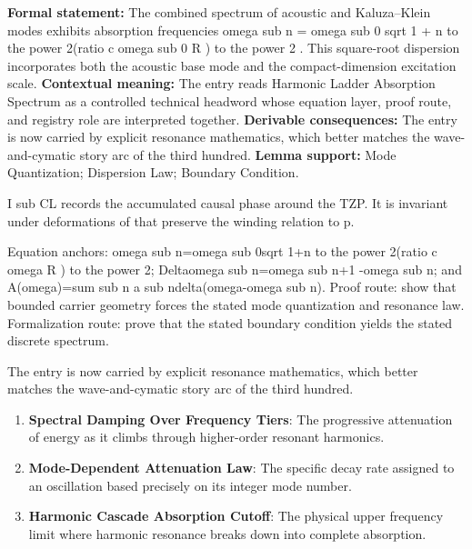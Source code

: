 \begingroup\footnotesize\setlength{\emergencystretch}{3em}\sloppy
\textbf{Formal statement:} The combined spectrum of acoustic and Kaluza--Klein modes exhibits absorption frequencies omega sub n = omega sub 0 sqrt 1 + n to the power 2(ratio c omega sub 0 R ) to the power 2 . This square-root dispersion incorporates both the acoustic base mode and the compact-dimension excitation scale. \textbf{Contextual meaning:} The entry reads Harmonic Ladder Absorption Spectrum as a controlled technical headword whose equation layer, proof route, and registry role are interpreted together. \textbf{Derivable consequences:} The entry is now carried by explicit resonance mathematics, which better matches the wave-and-cymatic story arc of the third hundred. \textbf{Lemma support:} Mode Quantization; Dispersion Law; Boundary Condition.\par
\endgroup

I sub CL records the accumulated causal phase around the TZP. It is invariant under deformations of that preserve the winding relation to p.

Equation anchors: omega sub n=omega sub 0sqrt 1+n to the power 2(ratio c omega R ) to the power 2; Deltaomega sub n=omega sub n+1 -omega sub n; and A(omega)=sum sub n a sub ndelta(omega-omega sub n). Proof route: show that bounded carrier geometry forces the stated mode quantization and resonance law. Formalization route: prove that the stated boundary condition yields the stated discrete spectrum.

The entry is now carried by explicit resonance mathematics, which better matches the wave-and-cymatic story arc of the third hundred.
\endgroup

\begin{enumerate}[leftmargin=1.6em,itemsep=6pt,topsep=4pt]
\item \textbf{Spectral Damping Over Frequency Tiers}: The progressive attenuation of energy as it climbs through higher-order resonant harmonics.
\item \textbf{Mode-Dependent Attenuation Law}: The specific decay rate assigned to an oscillation based precisely on its integer mode number.
\item \textbf{Harmonic Cascade Absorption Cutoff}: The physical upper frequency limit where harmonic resonance breaks down into complete absorption.
\end{enumerate}

